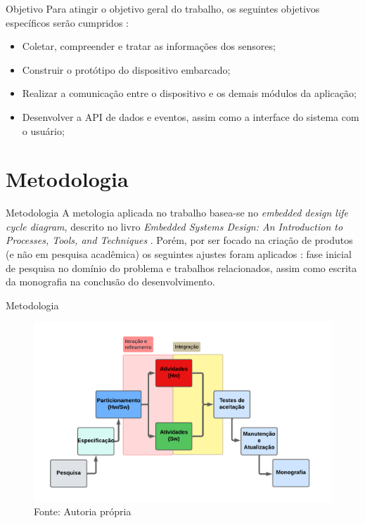 \documentclass[12pt]{beamer}
\begin{document}
    \begin{frame}{Objetivo}
        Para atingir o objetivo geral do trabalho, os seguintes objetivos específicos serão cumpridos : 
        \begin{itemize}
            \item Coletar, compreender e tratar as informações dos sensores;
            \item Construir o protótipo do dispositivo embarcado;
            \item Realizar a  comunicação entre o dispositivo e os demais módulos da aplicação;
            \item Desenvolver a API de dados e eventos, assim como a interface do sistema com o usuário;
        \end{itemize}
    \end{frame}

    \section{Metodologia}

    \begin{frame}{Metodologia}
        A metologia aplicada no trabalho basea-se no \textit{embedded design life cycle diagram}, descrito no livro \textit{Embedded Systems Design: An Introduction to Processes, Tools, and  Techniques} \cite{18WorkFlowEmbeddedSystem}. Porém, por ser focado na criação de produtos (e não em pesquisa acadêmica) os seguintes ajustes foram aplicados : fase inicial de pesquisa no domínio do problema e trabalhos relacionados, assim como  escrita da monografia na conclusão do desenvolvimento.
    \end{frame}

    \begin{frame}{Metodologia}
        \begin{figure}
            \centering
            \includegraphics[width=0.97\linewidth]{UEA.png}
            \caption{Fonte: Autoria própria}
            \label{fig:fig2}
        \end{figure}
    \end{frame}
\end{document}
